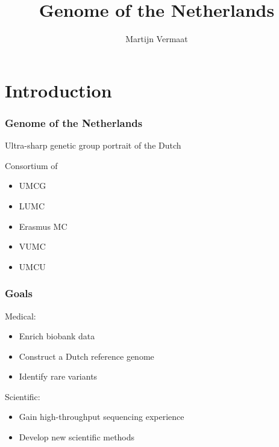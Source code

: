 \documentclass[slidestop,14pt]{beamer}
\title{Genome of the Netherlands}
\author{Martijn Vermaat}
\begin{document}

\bodytemplate


\section{Introduction}


\begin{frame}
  \frametitle{Genome of the Netherlands}

  \vspace{\baselineskip}

  Ultra-sharp genetic group portrait of the Dutch

  \pause

  \vspace{\baselineskip}

  Consortium of
  \begin{itemize}
    \item UMCG
    \item LUMC
    \item Erasmus MC
    \item VUMC
    \item UMCU
  \end{itemize}
\end{frame}

\begin{frame}
  \frametitle{Goals}

  \vspace{\baselineskip}

  Medical:
  \begin{itemize}
    \item Enrich biobank data
    \item Construct a Dutch reference genome
    \item Identify rare variants
  \end{itemize}

  \vspace{\baselineskip}

  Scientific:
  \begin{itemize}
    \item Gain high-throughput sequencing experience
    \item Develop new scientific methods
  \end{itemize}
\end{frame}
\end{document}
